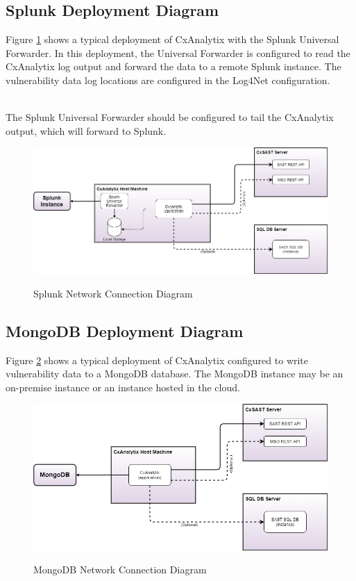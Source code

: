 \subsection{Splunk Deployment Diagram}
Figure \ref{fig:SPLUNK-network} shows a typical deployment of CxAnalytix with the Splunk Universal Forwarder. In this deployment,
the Universal Forwarder is configured to read the CxAnalytix log output and forward the data to a remote Splunk instance. The vulnerability 
data log locations are configured in the Log4Net configuration.

\noindent\\The Splunk Universal Forwarder should be configured to tail the CxAnalytix output, which will forward to Splunk.

\begin{figure}[h]
    \caption{Splunk Network Connection Diagram}
    \includegraphics[width=\textwidth]{graphics/Deployment-SPLUNK-connections.png}
    \label{fig:SPLUNK-network}
\end{figure}


\subsection{MongoDB Deployment Diagram}
Figure \ref{fig:MONGO-network} shows a typical deployment of CxAnalytix configured to write vulnerability data to a MongoDB database. 
The MongoDB instance may be an on-premise instance or an instance hosted in the cloud.

\begin{figure}[h]
    \caption{MongoDB Network Connection Diagram}
    \includegraphics[width=\textwidth]{graphics/Deployment-MONGO-connections.png}
    \label{fig:MONGO-network}
\end{figure}


